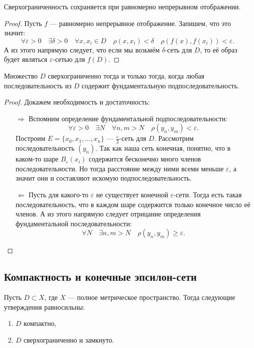 \begin{nlemma}
	Сверхограниченность сохраняется при равномерно непрерывном отображении.
\end{nlemma}
\begin{proof}
	Пусть \(f\) --- равномерно непрерывное отображение. Запишем, что это значит: \[
	\forall \varepsilon > 0 \quad \exists \delta > 0 \quad \forall x, x_i \in D \quad \rho(x, x_i) < \delta \quad \rho(f(x), f(x_i)) < \varepsilon.
	\]
	А из этого напрямую следует, что если мы возьмём \(\delta\)-сеть для \(D\), то её образ будет являться \(\varepsilon\)-сетью для \(f(D)\).
\end{proof}

\begin{nlemma}
	Множество \(D\) сверхограниченно тогда и только тогда, когда любая последовательность из \(D\) содержит фундаментальную подпоследовательность.
\end{nlemma}
\begin{proof}
	Докажем необходимость и достаточность:
	\begin{enumerate}
		\item[\(\Rightarrow\)] Вспомним определение фундаментальной подпоследовательности: \[
		\forall \varepsilon > 0 \quad \exists N \quad \forall n, m > N \quad \rho(y_{n}, y_{m}) < \varepsilon.
		\]
		Построим \(E = \{x_0, x_1,\ldots, x_n\}\) ---  \(\frac{\varepsilon}{2}\)-сеть для \(D\). Рассмотрим последовательность \((y_n)\). Так как наша сеть конечная, понятно, что в каком-то шаре \(B_\varepsilon (x_i)\) содержится бесконечно много членов последовательности. Но тогда расстояние между ними всеми меньше \(\varepsilon\), а значит они и составляют искомую подпоследовательность.
		\item[\(\Leftarrow\)] Пусть для какого-то \(\varepsilon\) не существует конечной \(\varepsilon\)-сети. Тогда есть такая последовательность, что в каждом шаре содержится только конечное число её членов. А из этого напрямую следует отрицание определения фундаментальной последовательности: \[
		\forall N \quad \exists n, m > N \quad \rho(y_{n}, y_{m}) \geqslant \varepsilon.
		\]
	\end{enumerate}
\end{proof}

\subsection{Компактность и конечные эпсилон-сети}

\begin{theorem}
	Пусть \(D \subset X\), где \(X\) --- полное метрическое пространство. Тогда следующие утверждения равносильны:
	\begin{enumerate}
		\item \(D\) компактно,
		\item \(D\) сверхограниченно и замкнуто.
	\end{enumerate}
\end{theorem}

